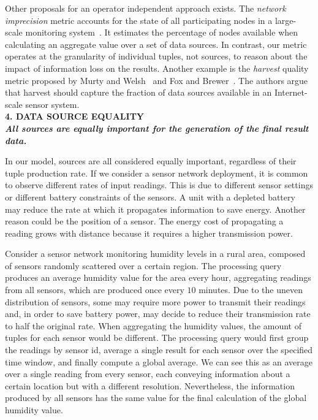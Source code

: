 Other proposals for an operator independent approach exists. The \textit{network imprecision}  metric
accounts for the state of all participating nodes in a large-scale monitoring
system~\cite{network-imprecision}.
It estimates the percentage of nodes available when calculating an aggregate value over a set of data
sources. In contrast, our metric operates at the granularity of individual tuples, not sources, to reason
about the impact of information loss on the results.
Another example is the \textit{harvest} quality metric proposed by Murty and
Welsh~\cite{dependable-is-sensing} and Fox and Brewer~\cite{Fox1999}. The authors argue that harvest
should capture the fraction of data sources available in an Internet-scale sensor system. \\
 
\textbf{4. DATA SOURCE EQUALITY \\ \textit{All sources are equally important for the generation of the
final result data.}}
	  
In our model, sources are all considered equally important, regardless of their tuple production rate.
If we consider a sensor network deployment, it is common to observe different rates of input readings.
This is due to different sensor settings or different battery constraints of the sensors. A unit with a
depleted battery may reduce the rate at which it propagates information to save energy.
Another reason could be the position of a sensor. The energy cost of propagating a reading grows with
distance because it requires a higher transmission power.
	
	Consider a sensor network monitoring humidity levels in a rural area, composed of sensors randomly
	scattered over a certain region. The processing query produces an average humidity value for the area
	every hour, aggregating readings from all sensors, which are produced once every $10$
	minutes. Due to the uneven distribution of sensors, some may require more power to transmit their
	readings and, in order to save battery power, may decide to reduce their transmission rate to half the original rate. 
	When aggregating the humidity values, the amount of tuples for each sensor would be different. The
	processing query would first group the readings by sensor id, average a single result for each sensor
	over the specified time window, and finally compute a global average. We can see this as an average
	over a single reading from every sensor, each conveying information about a certain location but with
	a different resolution. Nevertheless, the information produced by all sensors has the same value for the
	final calculation of the global humidity value.
	

